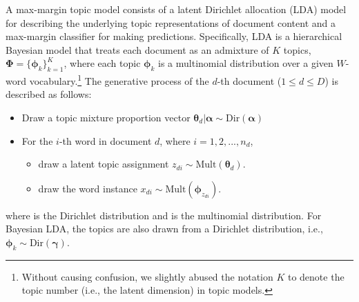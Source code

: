 \documentclass[twoside,11pt]{article}
\newcommand{\thetav}{\bm{\theta}}
\newcommand{\phiv}{\bm{\phi}}
\newcommand{\Phiv}{\bm{\Phi}}
\begin{document}
A max-margin topic model consists of a latent Dirichlet allocation (LDA) model~\citep{blei2003lda}  for describing the underlying topic representations of document content and a max-margin classifier for making predictions. Specifically, LDA is a hierarchical Bayesian model that treats each document as an admixture of $K$ topics, $\Phiv = \{\phiv_k\}_{k=1}^K$, where each topic $\bm{\phi}_k$ is a multinomial distribution over a given $W$-word vocabulary.\footnote{Without causing confusion, we slightly abused the notation $K$ to denote the topic number (i.e., the latent dimension) in topic models.} The generative process of the $d$-th document ($1 \leq d \leq D$) is described as follows:
%
\begin{itemize}
\item Draw a topic mixture proportion vector $\thetav_d | \bm{\alpha} \sim \text{Dir}(\bm{\alpha})$
\item For the $i$-th word in document $d$, where $i = 1, 2, ..., n_d$,
\begin{itemize}
\item draw a latent topic assignment  $z_{di} \sim \text{Mult}(\thetav_d)$.
\item draw the word instance $x_{di} \sim \text{Mult}(\phiv_{z_{di}})$.
\end{itemize}
\end{itemize}
where  is the Dirichlet distribution and  is the multinomial distribution.
%
For Bayesian LDA, the topics are also drawn from a Dirichlet distribution, i.e., $\bm{\phi}_k \sim \text{Dir}(\bm{\gamma})$.
\end{document}
